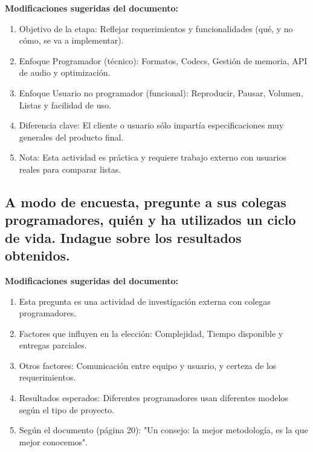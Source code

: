 \documentclass{article}
\begin{document}
\begin{framed}
\noindent\textbf{Modificaciones sugeridas del documento:}
\begin{enumerate}
    \item Objetivo de la etapa: Reflejar requerimientos y funcionalidades (qué, y no cómo, se va a implementar).
    \item Enfoque Programador (técnico): Formatos, Codecs, Gestión de memoria, API de audio y optimización.
    \item Enfoque Usuario no programador (funcional): Reproducir, Pausar, Volumen, Listas y facilidad de uso.
    \item Diferencia clave: El cliente o usuario sólo impartía especificaciones muy generales del producto final.
    \item Nota: Esta actividad es práctica y requiere trabajo externo con usuarios reales para comparar listas.
\end{enumerate}
\end{framed}

\subsection{A modo de encuesta, pregunte a sus colegas programadores, quién y ha utilizados un ciclo de vida. Indague sobre los resultados obtenidos.}

\begin{framed}
\noindent\textbf{Modificaciones sugeridas del documento:}
\begin{enumerate}
    \item Esta pregunta es una actividad de investigación externa con colegas programadores.
    \item Factores que influyen en la elección: Complejidad, Tiempo disponible y entregas parciales.
    \item Otros factores: Comunicación entre equipo y usuario, y certeza de los requerimientos.
    \item Resultados esperados: Diferentes programadores usan diferentes modelos según el tipo de proyecto.
    \item Según el documento (página 20): "Un consejo: la mejor metodología, es la que mejor conocemos".
\end{enumerate}
\end{framed}
\end{document}
